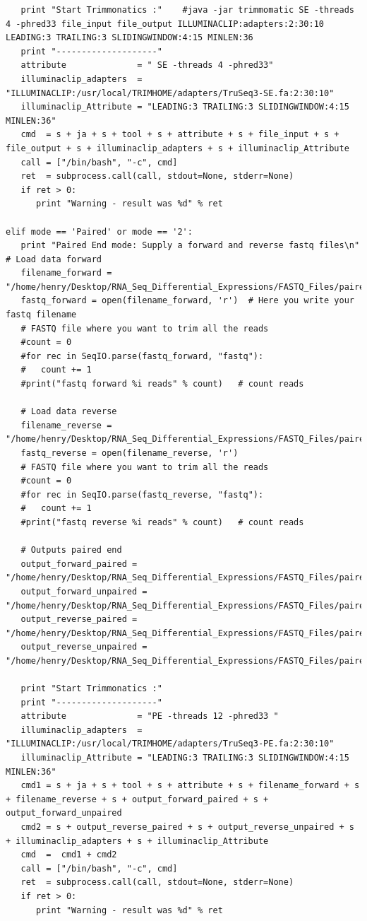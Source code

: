 \documentclass{article}
\begin{document}
\begin{itemize}
\begin{verbatim}
   print "Start Trimmonatics :"    #java -jar trimmomatic SE -threads 4 -phred33 file_input file_output ILLUMINACLIP:adapters:2:30:10 LEADING:3 TRAILING:3 SLIDINGWINDOW:4:15 MINLEN:36
   print "--------------------" 
   attribute              = " SE -threads 4 -phred33"
   illuminaclip_adapters  = "ILLUMINACLIP:/usr/local/TRIMHOME/adapters/TruSeq3-SE.fa:2:30:10"
   illuminaclip_Attribute = "LEADING:3 TRAILING:3 SLIDINGWINDOW:4:15 MINLEN:36"
   cmd  = s + ja + s + tool + s + attribute + s + file_input + s + file_output + s + illuminaclip_adapters + s + illuminaclip_Attribute
   call = ["/bin/bash", "-c", cmd]
   ret  = subprocess.call(call, stdout=None, stderr=None)
   if ret > 0:
      print "Warning - result was %d" % ret

elif mode == 'Paired' or mode == '2': 
   print "Paired End mode: Supply a forward and reverse fastq files\n"
# Load data forward
   filename_forward = "/home/henry/Desktop/RNA_Seq_Differential_Expressions/FASTQ_Files/paired_end/ERR950159_1.fastq"
   fastq_forward = open(filename_forward, 'r')  # Here you write your fastq filename
   # FASTQ file where you want to trim all the reads
   #count = 0
   #for rec in SeqIO.parse(fastq_forward, "fastq"):
   #   count += 1
   #print("fastq forward %i reads" % count)   # count reads

   # Load data reverse
   filename_reverse = "/home/henry/Desktop/RNA_Seq_Differential_Expressions/FASTQ_Files/paired_end/ERR950159_2.fastq"
   fastq_reverse = open(filename_reverse, 'r') 
   # FASTQ file where you want to trim all the reads
   #count = 0
   #for rec in SeqIO.parse(fastq_reverse, "fastq"):
   #   count += 1
   #print("fastq reverse %i reads" % count)   # count reads

   # Outputs paired end
   output_forward_paired = "/home/henry/Desktop/RNA_Seq_Differential_Expressions/FASTQ_Files/paired_end/output_forward_paired_ERR950159_1.fastq" 
   output_forward_unpaired = "/home/henry/Desktop/RNA_Seq_Differential_Expressions/FASTQ_Files/paired_end/output_forward_unpaired_ERR950159_1.fastq" 
   output_reverse_paired = "/home/henry/Desktop/RNA_Seq_Differential_Expressions/FASTQ_Files/paired_end/output_reverse_paired_ERR950159_2.fastq"  
   output_reverse_unpaired = "/home/henry/Desktop/RNA_Seq_Differential_Expressions/FASTQ_Files/paired_end/output_reverse_unpaired_ERR950159_2.fastq" 

   print "Start Trimmonatics :"    
   print "--------------------" 
   attribute              = "PE -threads 12 -phred33 "
   illuminaclip_adapters  = "ILLUMINACLIP:/usr/local/TRIMHOME/adapters/TruSeq3-PE.fa:2:30:10"
   illuminaclip_Attribute = "LEADING:3 TRAILING:3 SLIDINGWINDOW:4:15 MINLEN:36"
   cmd1 = s + ja + s + tool + s + attribute + s + filename_forward + s + filename_reverse + s + output_forward_paired + s + output_forward_unpaired
   cmd2 = s + output_reverse_paired + s + output_reverse_unpaired + s + illuminaclip_adapters + s + illuminaclip_Attribute
   cmd  =  cmd1 + cmd2
   call = ["/bin/bash", "-c", cmd]
   ret  = subprocess.call(call, stdout=None, stderr=None)
   if ret > 0:
      print "Warning - result was %d" % ret
\end{verbatim}
\normalsize
\end{itemize}
\end{document}

